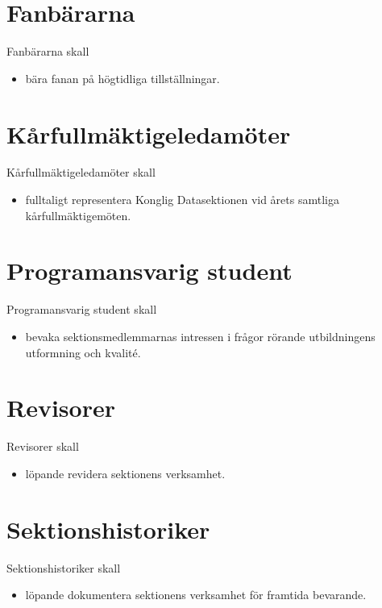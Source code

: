 \documentclass{dgovdoc}
\begin{document}
\section{Fanbärarna}

Fanbärarna skall

\begin{itemize}
\item bära fanan på högtidliga tillställningar.
\end{itemize}

\section{Kårfullmäktigeledamöter}

Kårfullmäktigeledamöter skall

\begin{itemize}
\item fulltaligt representera Konglig Datasektionen vid årets samtliga
    kårfullmäktigemöten.
\end{itemize}

\section{Programansvarig student}

Programansvarig student skall

\begin{itemize}
\item bevaka sektionsmedlemmarnas intressen i frågor rörande utbildningens
    utformning och kvalité.
\end{itemize}

\section{Revisorer}

Revisorer skall

\begin{itemize}
\item löpande revidera sektionens verksamhet.
\end{itemize}

\section{Sektionshistoriker}

Sektionshistoriker skall

\begin{itemize}
\item löpande dokumentera sektionens verksamhet för framtida bevarande.
\end{itemize}
\end{document}
